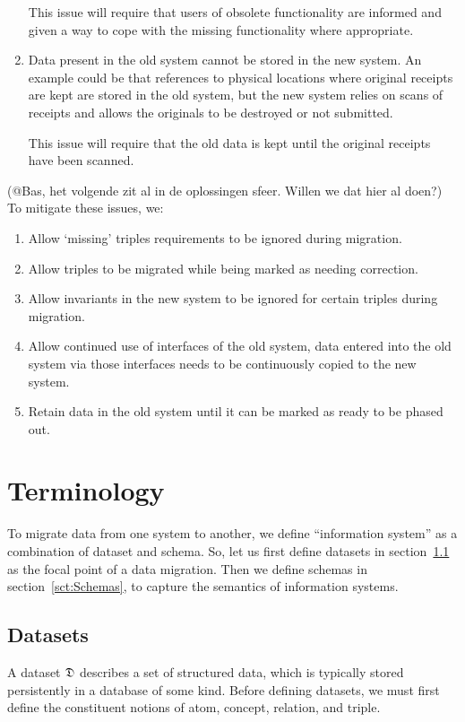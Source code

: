 \documentclass{elsarticle}
\begin{document}
\begin{enumerate}
   This issue will require that users of obsolete functionality are informed and given a way to cope with the missing functionality where appropriate.
\item Data present in the old system cannot be stored in the new system.
   An example could be that references to physical locations where original receipts are kept are stored in the old system,
   but the new system relies on scans of receipts and allows the originals to be destroyed or not submitted.

   This issue will require that the old data is kept until the original receipts have been scanned.
\end{enumerate}

(@Bas, het volgende zit al in de oplossingen sfeer. Willen we dat hier al doen?)
   To mitigate these issues, we:
   
   \begin{enumerate}
   \item Allow `missing' triples requirements to be ignored during migration.
   \item Allow triples to be migrated while being marked as needing correction.
   \item Allow invariants in the new system to be ignored for certain triples during migration.
   \item Allow continued use of interfaces of the old system, data entered into the old system via those interfaces needs to be continuously copied to the new system.
   \item Retain data in the old system until it can be marked as ready to be phased out.
   \end{enumerate}   

\section{Terminology}
\label{sct:Terminology}
   To migrate data from one system to another,
   we define ``information system'' as a combination of dataset and schema.
   So, let us first define datasets in section~\ref{sct:Datasets} as the focal point of a data migration.
   Then we define schemas in section~\ref{sct:Schemas}, to capture the semantics of information systems.

\subsection{Datasets}
\label{sct:Datasets}
   A dataset $\mathfrak{D}$ describes a set of structured data, which is typically stored persistently in a database of some kind.
   Before defining datasets, we must first define the constituent notions of atom, concept, relation, and triple.
   
\end{document}
